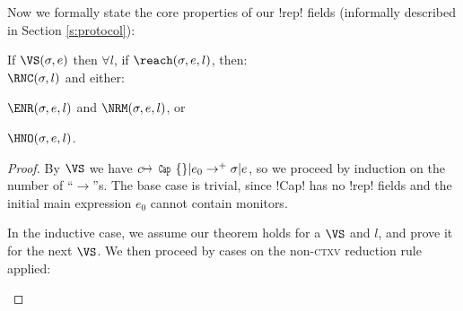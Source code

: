 \noindent Now we formally state the core properties of our \Q!rep! fields (informally described in Section \ref{s:protocol}):%
\SS\begin{theorem}
If $\VS(\s, e)$ then $\forall l$, if $\reach(\s, e, l)$, then:\\
\indent $\RNC(\s, l)$ and either:
\begin{iitemize}
\item $\ENR(\s, e, l)$ and $\NRM(\s, e, l)$, or
\item $\HNO(\s, e, l)$.
\end{iitemize}
\end{theorem}\SS
\begin{proof}
By $\VS$ we have $c\mapsto\Kw{Cap}\{\}|e_0\rightarrow^+ \s|e$, so we proceed by induction on the number of ``$\rightarrow$''s. The base case is trivial, since \Q!Cap! has no \Q!rep! fields and the initial main expression $e_0$ cannot contain monitors.

In the inductive case, we assume our theorem holds for a $\VS$ and \reach $l$, and prove it for the next $\VS$. We then proceed by cases on the non-\textsc{ctxv} reduction rule applied:

\begin{ienumerate}


\end{ienumerate}
\end{proof}
